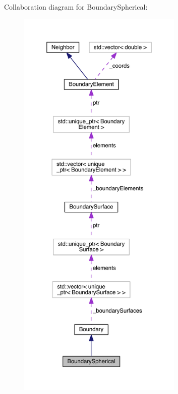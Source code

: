 Collaboration diagram for Boundary\+Spherical\+:
\nopagebreak
\begin{figure}[H]
\begin{center}
\leavevmode
\includegraphics[height=550pt]{classBoundarySpherical__coll__graph}
\end{center}
\end{figure}
